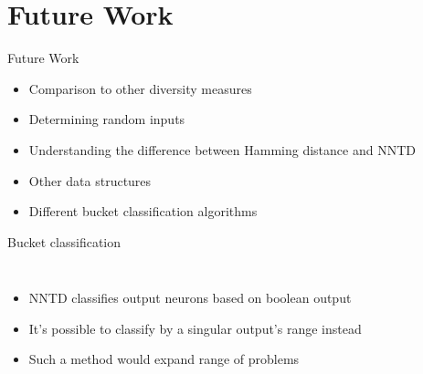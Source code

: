 \section{Future Work}
\begin{frame}{Future Work}
  \begin{itemize}
    \item Comparison to other diversity measures
    \item Determining random inputs %
    \item Understanding the difference between Hamming distance and NNTD
    \item Other data structures
    \item Different bucket classification algorithms
  \end{itemize}
\end{frame}

\begin{frame}{Bucket classification}
  \begin{columns}
    \column{0.5\paperwidth}
    \begin{itemize}
      \item NNTD classifies output neurons based on boolean output
      \item It's possible to classify by a singular output's range instead
      \item Such a method would expand range of problems
    \end{itemize}

    \column{0.5\paperwidth}
    \begin{figure}[htbp]
      \centering
      
    \end{figure}
  \end{columns}
\end{frame}
